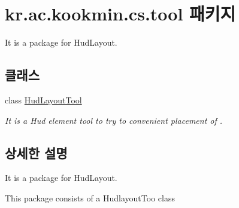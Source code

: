 \hypertarget{namespacekr_1_1ac_1_1kookmin_1_1cs_1_1tool}{}\section{kr.\+ac.\+kookmin.\+cs.\+tool 패키지}
\label{namespacekr_1_1ac_1_1kookmin_1_1cs_1_1tool}


It is a package for Hud\+Layout.  


\subsection*{클래스}
\begin{DoxyCompactItemize}
\item 
class \hyperlink{classkr_1_1ac_1_1kookmin_1_1cs_1_1tool_1_1_hud_layout_tool}{Hud\+Layout\+Tool}
\begin{DoxyCompactList}\small\item\em It is a Hud element tool to try to convenient placement of . \end{DoxyCompactList}\end{DoxyCompactItemize}


\subsection{상세한 설명}
It is a package for Hud\+Layout. 

This package consists of a Hudlayout\+Too class 